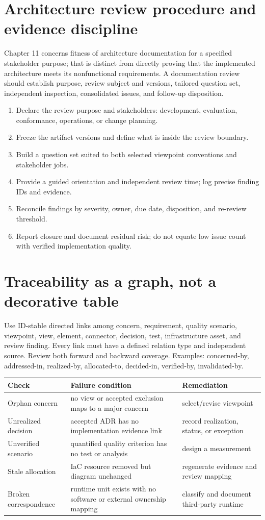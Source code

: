 \documentclass[10pt,letterpaper]{article}
\begin{document}
\section{Architecture review procedure and evidence discipline}
Chapter 11 concerns fitness of architecture documentation for a specified stakeholder purpose; that is distinct from directly proving that the implemented architecture meets its nonfunctional requirements. A documentation review should establish purpose, review subject and versions, tailored question set, independent inspection, consolidated issues, and follow-up disposition.

\begin{enumerate}
\item Declare the review purpose and stakeholders: development, evaluation, conformance, operations, or change planning.
\item Freeze the artifact versions and define what is inside the review boundary.
\item Build a question set suited to both selected viewpoint conventions and stakeholder jobs.
\item Provide a guided orientation and independent review time; log precise finding IDs and evidence.
\item Reconcile findings by severity, owner, due date, disposition, and re-review threshold.
\item Report closure and document residual risk; do not equate low issue count with verified implementation quality.
\end{enumerate}
\section{Traceability as a graph, not a decorative table}
Use ID-stable directed links among concern, requirement, quality scenario, viewpoint, view, element, connector, decision, test, infrastructure asset, and review finding. Every link must have a defined relation type and independent source. Review both forward and backward coverage. Examples: concerned-by, addressed-in, realized-by, allocated-to, decided-in, verified-by, invalidated-by.

\small
\begin{tabularx}{\linewidth}{@{}YYY@{}}
\toprule
\textbf{Check} & \textbf{Failure condition} & \textbf{Remediation} \\
\midrule
Orphan concern & no view or accepted exclusion maps to a major concern & select/revise viewpoint \\
Unrealized decision & accepted ADR has no implementation evidence link & record realization, status, or exception \\
Unverified scenario & quantified quality criterion has no test or analysis & design a measurement \\
Stale allocation & IaC resource removed but diagram unchanged & regenerate evidence and review mapping \\
Broken correspondence & runtime unit exists with no software or external ownership mapping & classify and document third-party runtime \\
\bottomrule
\end{tabularx}
\normalsize
\end{document}
